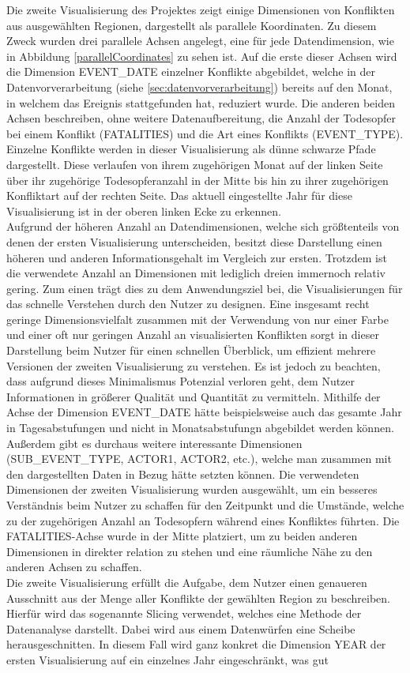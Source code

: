 \documentclass[usegeometry=true]{scrartcl}
\begin{document}
Die zweite Visualisierung des Projektes zeigt einige Dimensionen von Konflikten aus ausgewählten Regionen, dargestellt als parallele Koordinaten. Zu diesem Zweck wurden drei parallele Achsen angelegt, eine für jede Datendimension, wie in Abbildung \ref{parallelCoordinates} zu sehen ist. Auf die erste dieser Achsen wird die Dimension EVENT\_DATE einzelner Konflikte abgebildet, welche in der Datenvorverarbeitung (siehe \ref{sec:datenvorverarbeitung}) bereits auf den Monat, in welchem das Ereignis stattgefunden hat, reduziert wurde. Die anderen beiden Achsen beschreiben, ohne weitere Datenaufbereitung, die Anzahl der Todesopfer bei einem Konflikt (FATALITIES) und die Art eines Konflikts (EVENT\_TYPE). Einzelne Konflikte werden in dieser Visualisierung als dünne schwarze Pfade dargestellt. Diese verlaufen von ihrem zugehörigen Monat auf der linken Seite über ihr zugehörige Todesopferanzahl in der Mitte bis hin zu ihrer zugehörigen Konfliktart auf der rechten Seite. Das aktuell eingestellte Jahr für diese Visualisierung ist in der oberen linken Ecke zu erkennen.\\ Aufgrund der höheren Anzahl an Datendimensionen, welche sich größtenteils von denen der ersten Visualisierung unterscheiden, besitzt diese Darstellung einen höheren und anderen Informationsgehalt im Vergleich zur ersten. Trotzdem ist die verwendete Anzahl an Dimensionen mit lediglich dreien immernoch relativ gering. Zum einen trägt dies zu dem Anwendungsziel bei, die Visualisierungen für das schnelle Verstehen durch den Nutzer zu designen. Eine insgesamt recht geringe Dimensionsvielfalt zusammen mit der Verwendung von nur einer Farbe und einer oft nur geringen Anzahl an visualisierten Konflikten sorgt in dieser Darstellung beim Nutzer für einen schnellen Überblick, um effizient mehrere Versionen der zweiten Visualisierung zu verstehen. Es ist jedoch zu beachten, dass aufgrund dieses Minimalismus Potenzial verloren geht, dem Nutzer Informationen in größerer Qualität und Quantität zu vermitteln. Mithilfe der Achse der Dimension EVENT\_DATE hätte beispielsweise auch das gesamte Jahr in Tagesabstufungen und nicht in Monatsabstufungn abgebildet werden können. Außerdem gibt es durchaus weitere interessante Dimensionen (SUB\_EVENT\_TYPE, ACTOR1, ACTOR2, etc.), welche man zusammen mit den dargestellten Daten in Bezug hätte setzten können. Die verwendeten Dimensionen der zweiten Visualisierung wurden ausgewählt, um ein besseres Verständnis beim Nutzer zu schaffen für den Zeitpunkt und die Umstände, welche zu der zugehörigen Anzahl an Todesopfern während eines Konfliktes führten. Die FATALITIES-Achse wurde in der Mitte platziert, um zu beiden anderen Dimensionen in direkter relation zu stehen und eine räumliche Nähe zu den anderen Achsen zu schaffen.\\ Die zweite Visualisierung erfüllt die Aufgabe, dem Nutzer einen genaueren Ausschnitt aus der Menge aller Konflikte der gewählten Region zu beschreiben. Hierfür wird das sogenannte \glqq Slicing\grqq{} verwendet, welches eine Methode der Datenanalyse darstellt. Dabei wird aus einem Datenwürfen eine Scheibe \glqq herausgeschnitten\grqq. In diesem Fall wird ganz konkret die Dimension YEAR der ersten Visualisierung auf ein einzelnes Jahr eingeschränkt, was gut 
\end{document}
